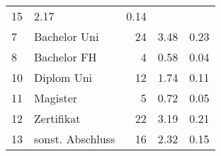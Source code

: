 \begin{longtable}{lXrrr}
       \num{15} &
       \num[round-mode=places,round-precision=2]{2,17} &
         \num[round-mode=places,round-precision=2]{0,14} \\

     7 &
     \multicolumn{1}{X}{ Bachelor Uni   } &


       \num{24} &
       \num[round-mode=places,round-precision=2]{3,48} &
         \num[round-mode=places,round-precision=2]{0,23} \\

     8 &
     \multicolumn{1}{X}{ Bachelor FH   } &


       \num{4} &
       \num[round-mode=places,round-precision=2]{0,58} &
         \num[round-mode=places,round-precision=2]{0,04} \\

     10 &
     \multicolumn{1}{X}{ Diplom Uni   } &


       \num{12} &
       \num[round-mode=places,round-precision=2]{1,74} &
         \num[round-mode=places,round-precision=2]{0,11} \\

     11 &
     \multicolumn{1}{X}{ Magister   } &


       \num{5} &
       \num[round-mode=places,round-precision=2]{0,72} &
         \num[round-mode=places,round-precision=2]{0,05} \\

     12 &
     \multicolumn{1}{X}{ Zertifikat   } &


       \num{22} &
       \num[round-mode=places,round-precision=2]{3,19} &
         \num[round-mode=places,round-precision=2]{0,21} \\

     13 &
     \multicolumn{1}{X}{ sonst. Abschluss   } &


       \num{16} &
       \num[round-mode=places,round-precision=2]{2,32} &
         \num[round-mode=places,round-precision=2]{0,15} \\


\end{longtable}

